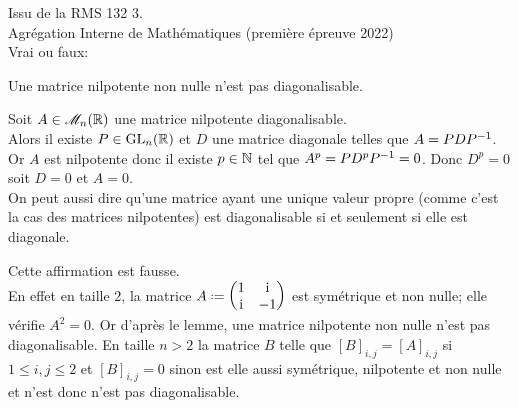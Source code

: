 \begin{exercice}
    Issu de la RMS 132 3. \\
    Agrégation Interne de Mathématiques (première épreuve 2022) \\
    Vrai ou faux: 
\end{exercice}

\begin{solution}
    \newline
    \begin{lemme}
        Une matrice nilpotente non nulle n'est pas diagonalisable.
    \end{lemme}
    
    \begin{preuve}
        Soit $A \in \mathscr{M}_n(\mathbb{R})$ une matrice nilpotente diagonalisable. \\
        Alors il existe $P \in \mathrm{GL}_n(\mathbb{R})$ et $D$ une matrice diagonale telles que $A = PDP^{-1}$. Or $A$ est nilpotente donc il existe $p \in \mathbb{N}$ tel que $A^p = P D^p P^{-1} = 0$. Donc $D^p = 0$ soit $D = 0$ et $A = 0$. \\
        On peut aussi dire qu'une matrice ayant une unique valeur propre (comme c'est la cas des matrices nilpotentes) est diagonalisable si et seulement si elle est diagonale.
    \end{preuve}
    Cette affirmation est fausse. \\
    En effet en taille $2$, la matrice $A \defeq \begin{pmatrix}
        1 & \mi \\
        \mi & -1
    \end{pmatrix}$ est symétrique et non nulle; elle vérifie $A^2 = 0$. Or d'après le lemme, une matrice nilpotente non nulle n'est pas diagonalisable. En taille $n > 2$ la matrice $B$ telle que $[B]_{i,j} = [A]_{i,j}$ si $1 \leqslant i, j \leqslant 2$ et $[B]_{i,j} = 0$ sinon est elle aussi symétrique, nilpotente et non nulle et n'est donc n'est pas diagonalisable. 
\end{solution}   

